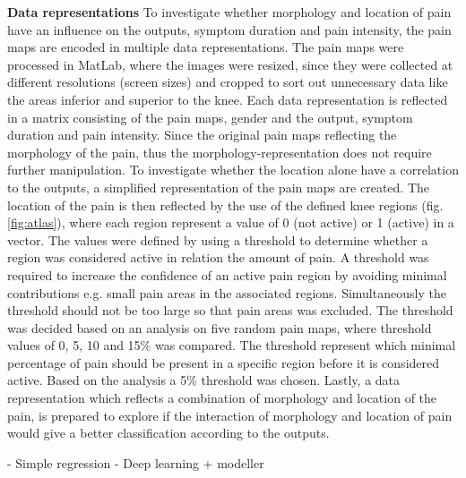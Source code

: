 \noindent
\textbf{Data representations} \newline
\noindent
To investigate whether morphology and location of pain have an influence on the outputs, symptom duration and pain intensity, the pain maps are encoded in multiple data representations. The pain maps were processed in MatLab, where the images were resized, since they were collected at different resolutions (screen sizes) and cropped to sort out unnecessary data like the areas inferior and superior to the knee.  Each data representation is reflected in a matrix consisting of the pain maps, gender and the output, symptom duration and pain intensity. Since the original pain maps reflecting the morphology of the pain, thus the morphology-representation does not require further manipulation. \newline
\noindent
To investigate whether the location alone have a correlation to the outputs, a simplified representation of the pain maps are created. The location of the pain is then reflected by the use of the defined knee regions (fig. \ref{fig:atlas}), where each region represent a value of 0 (not active) or 1 (active) in a vector.  The values were defined by using a threshold to determine whether a region was considered active in relation the amount of pain. A threshold was required to increase the confidence of an active pain region by avoiding minimal contributions e.g. small pain areas in the associated regions. Simultaneously the threshold should not be too large so that pain areas was excluded. The threshold was decided based on an analysis on five random pain maps, where threshold values of 0, 5, 10 and 15\% was compared. The threshold represent which minimal percentage of pain should be present in a specific region before it is considered active. Based on the analysis a 5\% threshold was chosen. \newline
\noindent
Lastly, a data representation which reflects a combination of morphology and location of the pain, is prepared to explore if the interaction of morphology and location of pain would give a better classification according to the outputs.


- Simple regression
- Deep learning + modeller